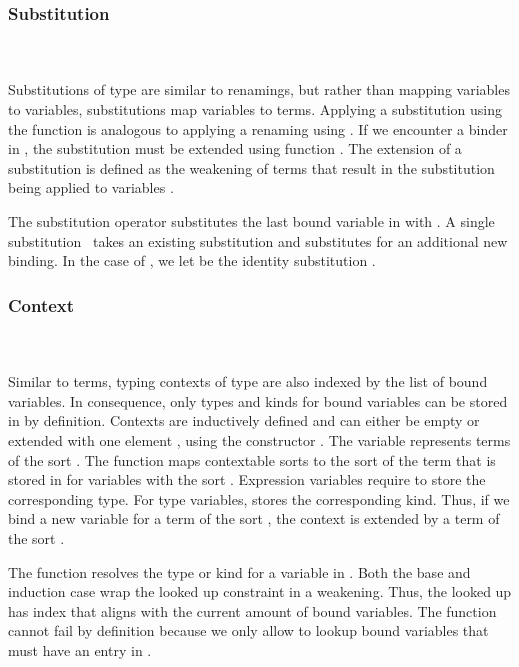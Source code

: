 \subsubsection{Substitution}\hfill\\\\
Substitutions  of type    are similar to renamings, but rather than mapping variables to variables, substitutions map variables to terms.
\FSub
Applying a substitution using the  function is analogous to applying a renaming using . If we encounter a binder in , the substitution must be extended using function .
\Fext
The extension of a substitution is defined as the weakening of terms that result in the substitution being applied to variables .

\noindent The substitution operator  \Data{[}  \Data{]} substitutes the last bound variable in  with .
\Fsubs
A single substitution \Fsinglesub\ takes an existing substitution  and substitutes  for an additional new binding. In the case of \Data{\_[\_]}, we let  be the identity substitution \Fidsub.

\subsubsection{Context}\hfill\\\\
Similar to terms, typing contexts  of type   are also indexed by the list of bound variables. In consequence, only types and kinds for bound variables can be stored in  by definition.
\FCtx
Contexts are inductively defined and can either be empty  or extended with one element , using the constructor   . The variable  represents terms of the sort  . 
\noindent The function  maps contextable sorts  to the sort of the term that is stored in  for variables with the sort .
\Fkind
Expression variables require  to store the corresponding type. 
For type variables,  stores the corresponding kind. Thus, if we bind a new variable for a term of the sort , the context  is extended by a term of the sort  .

\noindent The  function resolves the type or kind for a variable  in .
\Flookup
Both the base and induction case wrap the looked up constraint in a weakening. Thus, the looked up  has index  that aligns with the current amount of bound variables. The  function cannot fail by definition because we only allow to lookup bound variables that must have an entry in .


